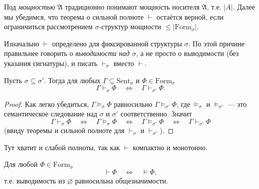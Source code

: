 \documentclass[12pt,a4paper]{article}
\newcommand{\Formul}{\ensuremath{\mathrm{Form}}\xspace}
\newcommand{\Sent}{\ensuremath{\mathrm{Sent}}\xspace}
\begin{document}
    \begin{remark}
        Под \emph{мощностью $\mathfrak{A}$} традиционно понимают мощность носителя $\mathfrak{A}$, т.е. $|A|$. Далее мы убедимся, что теорема о сильной полноте $\vdash$ остаётся верной, если ограничиться рассмотрением $\sigma$-структур мощности $\leqslant |\Formul_\sigma|$.
    \end{remark}

    \begin{definition}
        Изначально $\vdash$ определено для фиксированной структуры $\sigma$. По этой причине правильнее говорить о \emph{выводимости над $\sigma$}, а не просто о выводимости (без указания сигнатуры), и писать $\vdash_\sigma$ вместо $\vdash$.
    \end{definition}

    \begin{theorem}[о консервативности]
        Пусть $\sigma \subseteq \sigma'$. Тогда для любых $\Gamma \subseteq \Sent_\sigma$ и $\Phi \in \Formul_\sigma$
        \[
            \Gamma \vdash_\sigma \Phi
            \quad \Longleftrightarrow \quad
            \Gamma \vdash_{\sigma'} \Phi.
        \]
    \end{theorem}

    \begin{proof}
        Как легко убедиться, $\Gamma \vDash_\sigma \Phi$ равносильно $\Gamma \vDash_{\sigma'} \Phi$, где $\vDash_\sigma$ и $\vDash_{\sigma'}$ --- это семантическое следование над $\sigma$ и $\sigma'$ соответственно. Значит
        \[
            \Gamma \vdash_\sigma \Phi
            \quad \Longleftrightarrow \quad
            \Gamma \vDash_\sigma \Phi
            \quad \Longleftrightarrow \quad
            \Gamma \vDash_{\sigma'} \Phi
            \quad \Longleftrightarrow \quad
            \Gamma \vdash_{\sigma'} \Phi
        \]
        (ввиду теоремы и сильной полноте для $\vdash_\sigma$ и $\vdash_{\sigma'}$).
    \end{proof}

    \begin{remark}
        Тут хватит и слабой полноты, так как $\vdash$ компактно и монотонно.
    \end{remark}

    \begin{theorem}
        Для любой $\Phi \in \Formul_\sigma$
        \[
            \vdash \Phi
            \quad \Longleftrightarrow \quad
            \vDash \Phi,
        \]
        т.е. выводимость из $\varnothing$ равносильна общезначимости.
    \end{theorem}
\end{document}
